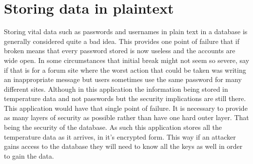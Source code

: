 

\section{Storing data in plaintext}

Storing vital data such as passwords and usernames in plain text in a database is generally considered quite a bad idea. This provides one point of failure that if broken means that every password stored is now useless and the accounts are wide open. In some circumstances that initial break might not seem so severe, say if that is for a forum site where the worst action that could be taken was writing an inappropriate message but users sometimes use the same password for many different sites. Although in this application the information being stored in temperature data and not passwords but the security implications are still there. This application would have that single point of failure. It is necessary to provide as many layers of security as possible rather than have one hard outer layer. That being the security of the database. As such this application stores all the temperature data as it arrives, in it's encrypted form. This way if an attacker gains access to the database they will need to know all the keys as well in order to gain the data.

